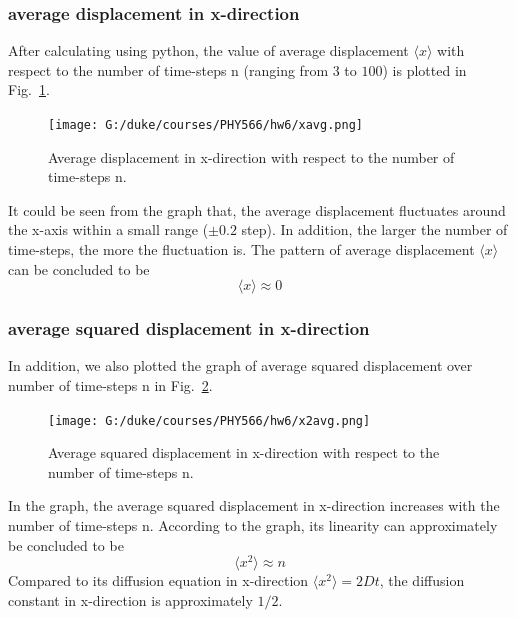 \documentclass[a4paper,12pt]{article}
\begin{document}
\subsubsection{average displacement in x-direction}
After calculating using python, the value of average displacement $\langle x \rangle$ with respect to the number of time-steps n (ranging from $3$ to $100$) is plotted in Fig.~\ref{Fig:xavg}. \\
\begin{figure}[!htb]
 \centering
  \texttt{[image: G:/duke/courses/PHY566/hw6/xavg.png]}
  \caption{Average displacement in x-direction with respect to the number of time-steps n.}
  \label{Fig:xavg}
\end{figure}
It could be seen from the graph that, the average displacement fluctuates around the x-axis within a small range ($\pm 0.2$ step). In addition, the larger the number of time-steps, the more the fluctuation is. The pattern of average displacement $\langle x \rangle$ can be concluded to be $$\langle x \rangle \approx 0$$

\subsubsection{average squared displacement in x-direction}
In addition, we also plotted the graph of average squared displacement over number of time-steps n in Fig.~\ref{Fig:x2avg}. \\
\begin{figure}[!htb]
  \centering
  \texttt{[image: G:/duke/courses/PHY566/hw6/x2avg.png]}
  \caption{Average squared displacement in x-direction with respect to the number of time-steps n.}
  \label{Fig:x2avg}
\end{figure}
In the graph, the average squared displacement in x-direction increases with the number of time-steps n. According to the graph, its linearity can approximately be concluded to be $$\langle x^2 \rangle \approx n$$ Compared to its diffusion equation in x-direction $\langle x^2 \rangle = 2Dt$, the diffusion constant in x-direction is approximately $1/2$.
\end{document}
